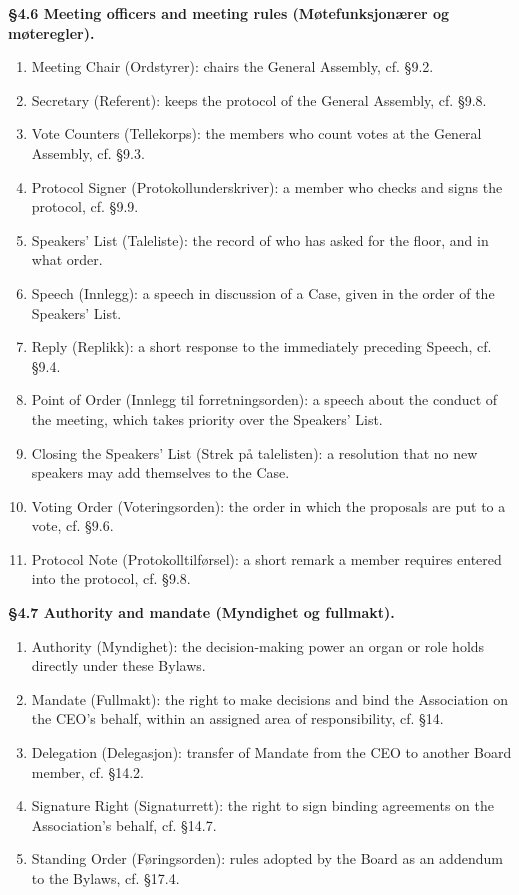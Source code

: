 \documentclass{../../../Common/Latex/Templates/rapport}
\begin{document}
\textbf{\S 4.6 Meeting officers and meeting rules (Møtefunksjonærer og møteregler).}
\begin{enumerate}
  \item Meeting Chair (Ordstyrer): chairs the General Assembly, cf. \S9.2.
  \item Secretary (Referent): keeps the protocol of the General Assembly, cf. \S9.8.
  \item Vote Counters (Tellekorps): the members who count votes at the General Assembly, cf. \S9.3.
  \item Protocol Signer (Protokollunderskriver): a member who checks and signs the protocol, cf. \S9.9.
  \item Speakers' List (Taleliste): the record of who has asked for the floor, and in what order.
  \item Speech (Innlegg): a speech in discussion of a Case, given in the order of the Speakers' List.
  \item Reply (Replikk): a short response to the immediately preceding Speech, cf. \S9.4.
  \item Point of Order (Innlegg til forretningsorden): a speech about the conduct of the meeting, which takes priority over the Speakers' List.
  \item Closing the Speakers' List (Strek på talelisten): a resolution that no new speakers may add themselves to the Case.
  \item Voting Order (Voteringsorden): the order in which the proposals are put to a vote, cf. \S9.6.
  \item Protocol Note (Protokolltilførsel): a short remark a member requires entered into the protocol, cf. \S9.8.
\end{enumerate}

\textbf{\S 4.7 Authority and mandate (Myndighet og fullmakt).}
\begin{enumerate}
  \item Authority (Myndighet): the decision-making power an organ or role holds directly under these Bylaws.
  \item Mandate (Fullmakt): the right to make decisions and bind the Association on the CEO's behalf, within an assigned area of responsibility, cf. \S14.
  \item Delegation (Delegasjon): transfer of Mandate from the CEO to another Board member, cf. \S14.2.
  \item Signature Right (Signaturrett): the right to sign binding agreements on the Association's behalf, cf. \S14.7.
  \item Standing Order (Føringsorden): rules adopted by the Board as an addendum to the Bylaws, cf. \S17.4.
\end{enumerate}
\end{document}
